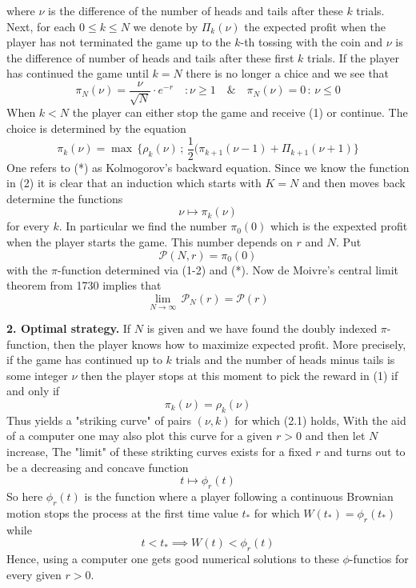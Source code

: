 \documentclass[12pt]{amsart}
\begin{document}
where $\nu$ is the difference of the number of heads and tails after these 
$k$ trials.
Next, for each $0\leq k\leq N$
we denote by $\Pi_k(\nu)$
the expected profit when the player has not 
terminated the game
up to the $k$-th tossing with the coin
and $\nu$  is the difference of number of heads and tails after
these  first $k$ trials.
If the player has continued the game until
$k=N$ there is no longer a chice and we see that
\[
\pi_N(\nu)=\frac{\nu}{\sqrt{N}}\cdot e^{-r}\quad\colon \nu\geq 1\quad \&\quad 
\pi_N(\nu)=0\,\colon\,  \nu\leq 0\tag{2}
\]
When $k<N$
the player can either stop the game and receive
(1) or continue. The choice is determined by the equation
\[
\pi_k(\nu)= \max\, \{\rho_k(\nu)\,;\,
\frac{1}{2}(\pi_{k+1}(\nu-1)+\Pi_{k+1}(\nu+1)\}\tag{*}
\]
One refers to (*) as Kolmogorov's backward equation. Since
we know the function in (2) it is clear that
an induction which starts with $K=N$ and then moves
back determine
the functions
\[
\nu\mapsto \pi_k(\nu)
\]
for every $k$. In particular we find the number
$\pi_0(0)$ which is the expexted profit when the player starts
the game.
This number depends on $r$ and $N$. Put
\[
\mathcal P(N,r)= \pi_0(0)
\] 
with
the $\pi$-function determined via (1-2) and (*). Now 
de Moivre's central limit theorem from 1730
implies that
\[
\lim_{N\to \infty}\, \mathcal  P_N(r)= \mathcal P(r)
\]
\medskip


\noindent
{\bf{2. Optimal strategy.}}
If $N$ is given and we have found
the doubly indexed $\pi$-function, then
the player knows   how to maximize expected profit.
More precisely, if the game has continued up to $k$ trials
and  the number of heads minus tails is some integer $\nu$
then the player stops
at this moment to pick the reward in (1) if and only if
\[
\pi_k(\nu)=\rho_k(\nu)\tag{2.1}
\]
Thus yields
a "striking curve"
of pairs $(\nu,k)$ for which  (2.1) holds,
With the aid of a computer one may
also plot this curve for a given $r>0$ and then let
$N$ increase, The "limit" of these strikting curves
exists for a fixed $r$ and turns out to be a decreasing and
concave function 
\[
t\mapsto \phi_r(t)
\]
So here $\phi_r(t)$  is the function where a player
following a continuous Brownian motion
stops the process at the first time value $t_*$ for which
$W(t_*)=\phi_r(t_*)$ while
\[
t<t_*\implies W(t)<\phi_r(t)
\]
Hence,  using a computer 
one gets good numerical  solutions to
these $\phi$-functios for every given  $r>0$.
\medskip
\end{document}
